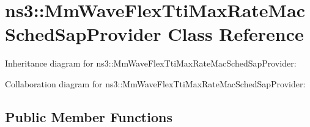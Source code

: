 \hypertarget{classns3_1_1MmWaveFlexTtiMaxRateMacSchedSapProvider}{}\section{ns3\+:\+:Mm\+Wave\+Flex\+Tti\+Max\+Rate\+Mac\+Sched\+Sap\+Provider Class Reference}
\label{classns3_1_1MmWaveFlexTtiMaxRateMacSchedSapProvider}


Inheritance diagram for ns3\+:\+:Mm\+Wave\+Flex\+Tti\+Max\+Rate\+Mac\+Sched\+Sap\+Provider\+:


Collaboration diagram for ns3\+:\+:Mm\+Wave\+Flex\+Tti\+Max\+Rate\+Mac\+Sched\+Sap\+Provider\+:
\subsection*{Public Member Functions}
